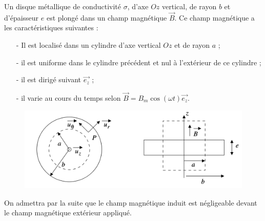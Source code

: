 \documentclass{report}
\begin{document}
Un disque métallique de conductivité $\sigma$, d'axe $Oz$ vertical, de rayon $b$ et d'épaisseur $e$ est plongé dans un champ magnétique $\vec{B}$. Ce champ magnétique a les caractéristiques suivantes :
\begin{itemize}

\item[-] Il est localisé dans un cylindre d'axe vertical $Oz$ et de rayon $a$ ;
\item[-] il est uniforme dans le cylindre précédent et nul à l'extérieur de ce cylindre ;
\item[-] il est dirigé suivant $\vec{e_z}$ ;
\item[-] il varie au cours du temps selon $\vec{B}=B_m\cos(\omega t)\vec{e_z}$.

\end{itemize}

\begin{figure}[h!]
\centering
		\includegraphics[scale=0.25]{induction3.png}
\end{figure}

On admettra par la suite que le champ magnétique induit est négligeable devant le champ magnétique extérieur appliqué. 
\end{document}
